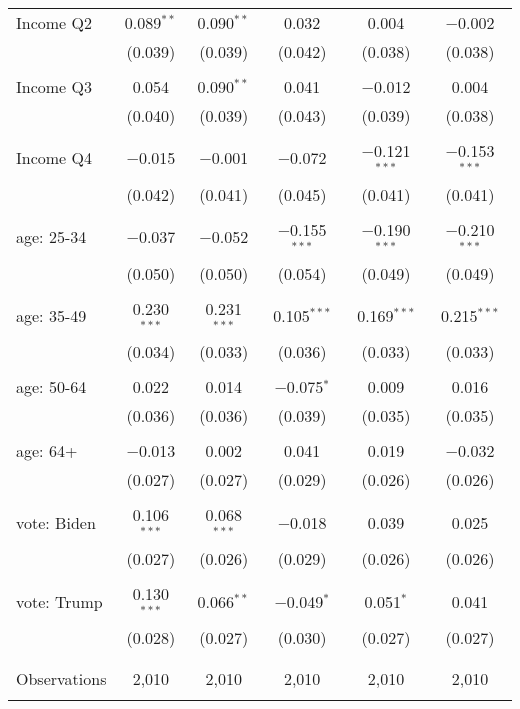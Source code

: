\begin{tabular}{@{\extracolsep{5pt}}lccccc}
 Income Q2 & 0.089$^{**}$ & 0.090$^{**}$ & 0.032 & 0.004 & $-$0.002 \\ 
  & (0.039) & (0.039) & (0.042) & (0.038) & (0.038) \\ 
  & & & & & \\ 
 Income Q3 & 0.054 & 0.090$^{**}$ & 0.041 & $-$0.012 & 0.004 \\ 
  & (0.040) & (0.039) & (0.043) & (0.039) & (0.038) \\ 
  & & & & & \\ 
 Income Q4 & $-$0.015 & $-$0.001 & $-$0.072 & $-$0.121$^{***}$ & $-$0.153$^{***}$ \\ 
  & (0.042) & (0.041) & (0.045) & (0.041) & (0.041) \\ 
  & & & & & \\ 
 age: 25-34 & $-$0.037 & $-$0.052 & $-$0.155$^{***}$ & $-$0.190$^{***}$ & $-$0.210$^{***}$ \\ 
  & (0.050) & (0.050) & (0.054) & (0.049) & (0.049) \\ 
  & & & & & \\ 
 age: 35-49 & 0.230$^{***}$ & 0.231$^{***}$ & 0.105$^{***}$ & 0.169$^{***}$ & 0.215$^{***}$ \\ 
  & (0.034) & (0.033) & (0.036) & (0.033) & (0.033) \\ 
  & & & & & \\ 
 age: 50-64 & 0.022 & 0.014 & $-$0.075$^{*}$ & 0.009 & 0.016 \\ 
  & (0.036) & (0.036) & (0.039) & (0.035) & (0.035) \\ 
  & & & & & \\ 
 age: 64+ & $-$0.013 & 0.002 & 0.041 & 0.019 & $-$0.032 \\ 
  & (0.027) & (0.027) & (0.029) & (0.026) & (0.026) \\ 
  & & & & & \\ 
 vote: Biden & 0.106$^{***}$ & 0.068$^{***}$ & $-$0.018 & 0.039 & 0.025 \\ 
  & (0.027) & (0.026) & (0.029) & (0.026) & (0.026) \\ 
  & & & & & \\ 
 vote: Trump & 0.130$^{***}$ & 0.066$^{**}$ & $-$0.049$^{*}$ & 0.051$^{*}$ & 0.041 \\ 
  & (0.028) & (0.027) & (0.030) & (0.027) & (0.027) \\ 
  & & & & & \\ 
\hline \\[-1.8ex] 

Observations & 2,010 & 2,010 & 2,010 & 2,010 & 2,010 \\ 
\hline 
\hline \\[-1.8ex] 
\end{tabular} 